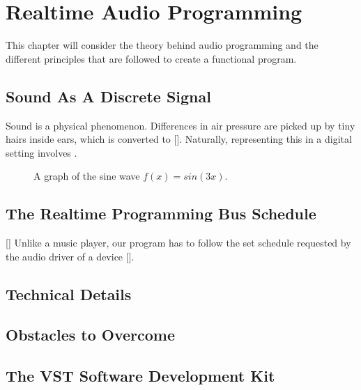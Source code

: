 \chapter{Realtime Audio Programming}
\hspace*{-0.155cm}This chapter will consider the theory behind audio programming and the different principles that are followed to create a functional program.
\section{Sound As A Discrete Signal}
Sound is a physical phenomenon. Differences in air pressure are picked up by tiny hairs inside ears, which is converted to []. Naturally, representing this in a digital setting involves .

\begin{figure}[h] %
\begin{center}
	\caption{A graph of the sine wave \(f(x) = sin(3x)\).}
\end{center}
\end{figure}

\section{The Realtime Programming Bus Schedule}
[] Unlike a music player, our program has to follow the set schedule requested by the audio driver of a device [].
\section{Technical Details}
\section{Obstacles to Overcome}
\section{The VST Software Development Kit}
